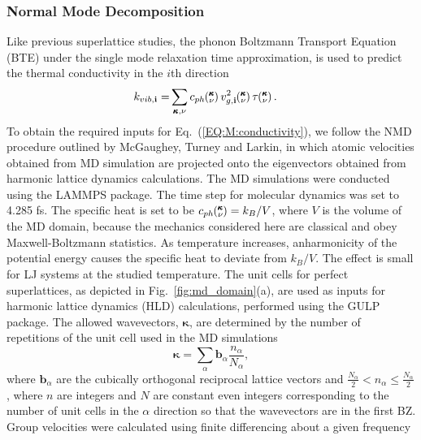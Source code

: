 \subsubsection{Normal Mode Decomposition}
Like previous superlattice studies, \cite{Luckyanova16112012,doi:10.1021/nl202186y} the phonon Boltzmann Transport Equation (BTE) under the single mode relaxation time approximation,\cite{ziman_electrons_2001} is used to predict the thermal conductivity in the $i$th direction
\begin{equation}\label{EQ:M:conductivity}
\begin{split}
k_{vib,\mathbf{i}}=&\sum_{\pmb{\kappa},\nu} c_{ph}\kv
v^{2}_{g,\mathbf{i}}\kv \tau\kv.
\end{split}
\end{equation}
To obtain the required inputs for Eq.~(\ref{EQ:M:conductivity}), we follow the NMD procedure outlined by McGaughey\cite{PhysRevB.71.184305}, Turney \cite {PhysRevB.81.081411} and Larkin,\cite{jason_inpress} in which atomic velocities obtained from MD simulation are projected onto the eigenvectors obtained from harmonic lattice dynamics calculations. The MD simulations were conducted using the LAMMPS package.\cite{LAMMPS} The time step for molecular dynamics was set to 4.285 fs. The specific heat is set to be $c_{ph}\mspace{-4.0mu}\left(\mspace{-8.0mu} \begin{smallmatrix}&\pmb{\kappa} \\&\nu\end{smallmatrix} \mspace{-3.0mu}\right)=k_B/V$, where $V$ is the volume of the MD domain, because the mechanics considered here are classical and obey Maxwell-Boltzmann statistics. As temperature increases, anharmonicity of the potential energy causes the specific heat to deviate from $k_B/V$. The effect is small for LJ systems at the studied temperature.\cite{jason_inpress} The unit cells for perfect superlattices, as depicted in Fig.~\ref{fig:md_domain}(a), are used as inputs for harmonic lattice dynamics (HLD) calculations, performed using the GULP package.\cite{GULP} The allowed wavevectors, $\pmb{\kappa}$, are determined by the number of repetitions of the unit cell used in the MD simulations
\begin{equation}\label{EQ:NMD:allowdkpt}
\pmb{\kappa} = \sum_{\alpha} \pmb{b}_{\alpha} \frac{n_{\alpha}}{N_{\alpha}},
\end{equation}
where $\pmb{b}_\alpha$ are the cubically orthogonal reciprocal lattice vectors and $ \frac{N_\alpha}{2} < n_\alpha \le \frac {N_\alpha}{2}$, where $n$ are integers and $N$ are constant even integers corresponding to the number of unit cells in the $\alpha$ direction so that the wavevectors are in the first BZ. Group velocities were calculated using finite differencing about a given frequency
